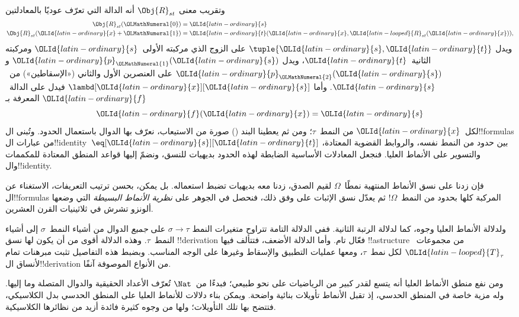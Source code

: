 \documentclass[../../../include/open-logic-section]{subfiles}
\begin{document}
وتقريب معنى $\Obj{R}_{st}$ أنه الدالة التي تعرّف عوديًا بالمعادلتين
\begin{align*}
\Obj{R}_{st}(\OLMathNumeral{0}) & = \OLId{latin-ordinary}{s} \\
\Obj{R}_{st}(\OLId{latin-ordinary}{x}+\OLMathNumeral{1}) & = \OLId{latin-ordinary}{t}(\OLId{latin-ordinary}{x}, \OLId{latin-looped}{R}_{st}(\OLId{latin-ordinary}{x})),
\end{align*}
ويدل $\tuple{\OLId{latin-ordinary}{s}, \OLId{latin-ordinary}{t}}$ على الزوج الذي مركبته الأولى~$\OLId{latin-ordinary}{s}$ ومركبته
الثانية~$\OLId{latin-ordinary}{t}$، ويدل $\OLId{latin-ordinary}{p}_\OLMathNumeral{1}(\OLId{latin-ordinary}{s})$ و$\OLId{latin-ordinary}{p}_\OLMathNumeral{2}(\OLId{latin-ordinary}{s})$ على العنصرين الأول والثاني
(«الإسقاطين») من~$\OLId{latin-ordinary}{s}$. وأما $\lambd[\OLId{latin-ordinary}{x}][\OLId{latin-ordinary}{s}]$ فيدل على الدالة~$\OLId{latin-ordinary}{f}$
المعرفة بـ
\[
\OLId{latin-ordinary}{f}(\OLId{latin-ordinary}{x}) = \OLId{latin-ordinary}{s}
\]
لكل~$\OLId{latin-ordinary}{x}$ من النمط~$\tau$؛ ومن ثم يعطينا البند () صورة من الاستيعاب،
نعرّف بها الدوال باستعمال الحدود. وتُبنى ال!!{formula}s من
عبارات ال!!{identity}~$\eq[\OLId{latin-ordinary}{s}][\OLId{latin-ordinary}{t}]$ بين حدود من النمط نفسه، والروابط
القضوية المعتادة، والتسوير على الأنماط العليا. فنجعل
المعادلات الأساسية الضابطة لهذه الحدود بديهيات للنسق، ونضمّ إليها
قواعد المنطق المعتادة للمكممات وال!!{identity}.

فإن زدنا على نسق الأنماط المنتهية نمطًا~$\Omega$ لقيم الصدق،
زدنا معه بديهيات تضبط استعماله. بل يمكن، بحسن ترتيب التعريفات،
الاستغناء عن ال!!{formula}s المركبة كلها بحدود من النمط~$\Omega$!{}
ثم يعدّل نسق الإثبات على وفق ذلك، فنحصل في الجوهر على
\emph{نظرية الأنماط البسيطة} التي وضعها ألونزو تشرش في
ثلاثينيات القرن العشرين.

ولدلالة الأنماط العليا وجوه، كما لدلالة الرتبة الثانية.
ففي الدلالة التامة تتراوح متغيرات النمط $\sigma
\to \tau$ على \emph{جميع} الدوال من أشياء النمط~$\sigma$
إلى أشياء النمط~$\tau$. وهذه الدلالة أقوى من أن يكون لها
نسق !!{derivation} فعّال تام. وأما الدلالة الأضعف، فتتألف فيها
!!a{structure} من مجموعات~$\OLId{latin-looped}{T}_\tau$ لكل نمط~$\tau$، ومعها
عمليات التطبيق والإسقاط وغيرها على الوجه المناسب. وبضبط هذه
التفاصيل تثبت مبرهنات تمام لأنساق ال!!{derivation} من الأنواع
الموصوفة آنفًا.

ومن نفع منطق الأنماط العليا أنه يتسع لقدر كبير من الرياضيات
على نحو طبيعي؛ فبدءًا من~$\Nat$ تُعرّف الأعداد الحقيقية والدوال
المتصلة وما إليها. وله مزية خاصة في المنطق الحدسي، إذ تقبل
الأنماط تأويلات بنائية واضحة. ويمكن بناء دلالات للأنماط العليا
على المنطق الحدسي بدل الكلاسيكي، فتتضح بها تلك التأويلات؛ ولها
من وجوه كثيرة فائدة أزيد من نظائرها الكلاسيكية.
\end{document}
